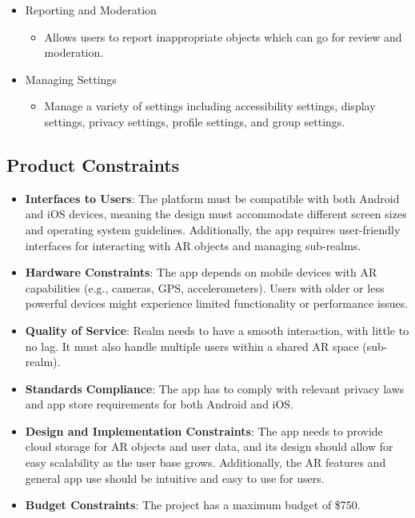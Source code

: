 \documentclass{article}
\begin{document}
\begin{itemize}
    \item Reporting and Moderation
    \begin{itemize}
        \item Allows users to report inappropriate objects which can go for review and moderation.
    \end{itemize}

    \item Managing Settings
    \begin{itemize}
        \item Manage a variety of settings including accessibility settings, display settings, privacy settings, profile settings, and group settings.
    \end{itemize}
\end{itemize}
\subsection{Product Constraints}

\begin{itemize}
    \item \textbf{Interfaces to Users}: The platform must be compatible with both Android and iOS devices, meaning the design must accommodate different screen sizes and operating system guidelines. Additionally, the app requires user-friendly interfaces for interacting with AR objects and managing sub-realms.

    \item \textbf{Hardware Constraints}: The app depends on mobile devices with AR capabilities (e.g., cameras, GPS, accelerometers). Users with older or less powerful devices might experience limited functionality or performance issues.

    \item \textbf{Quality of Service}: Realm needs to have a smooth interaction, with little to no lag. It must also handle multiple users within a shared AR space (sub-realm).

    \item \textbf{Standards Compliance}: The app has to comply with relevant privacy laws and app store requirements for both Android and iOS.

    \item \textbf{Design and Implementation Constraints}: The app needs to provide cloud storage for AR objects and user data, and its design should allow for easy scalability as the user base grows. Additionally, the AR features and general app use should be intuitive and easy to use for users.

    \item \textbf{Budget Constraints}: The project has a maximum budget of \$750.
\end{itemize}
\end{document}
